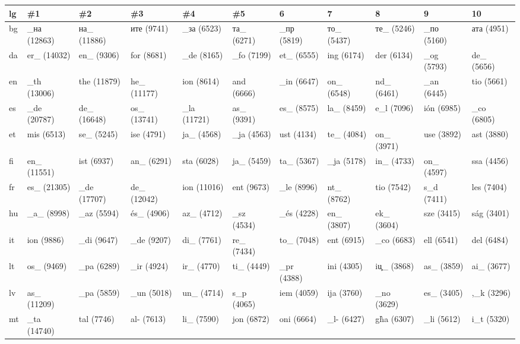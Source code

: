 \begin{tabular}{l|llllllllll}
lg&\#1&\#2&\#3&\#4&\#5&6&7&8&9&10\\
\hline
bg	&\foreignlanguage{russian}{\_на} (12863)	&\foreignlanguage{russian}{на\_} (11886)	&\foreignlanguage{russian}{ите} (9741)	&\foreignlanguage{russian}{\_за} (6523)	&\foreignlanguage{russian}{та\_} (6271)	&\foreignlanguage{russian}{\_пр} (5819)	&\foreignlanguage{russian}{то\_} (5437)	&\foreignlanguage{russian}{те\_} (5246)	&\foreignlanguage{russian}{\_по} (5160)	&\foreignlanguage{russian}{ата} (4951)\\
da	&er\_ (14032)	&en\_ (9306)	&for (8681)	&\_de (8165)	&\_fo (7199)	&et\_ (6555)	&ing (6174)	&der (6134)	&\_og (5793)	&de\_ (5656)\\
en	&\_th (13006)	&the (11879)	&he\_ (11177)	&ion (8614)	&and (6666)	&\_in (6647)	&on\_ (6548)	&nd\_ (6461)	&\_an (6445)	&tio (5661)\\
es	&\_de (20787)	&de\_ (16648)	&os\_ (13741)	&\_la (11721)	&as\_ (9391)	&es\_ (8575)	&la\_ (8459)	&e\_l (7096)	&ión (6985)	&\_co (6805)\\
et	&mis (6513)	&se\_ (5245)	&ise (4791)	&ja\_ (4568)	&\_ja (4563)	&ust (4134)	&te\_ (4084)	&on\_ (3971)	&use (3892)	&ast (3880)\\
fi	&en\_ (11551)	&ist (6937)	&an\_ (6291)	&sta (6028)	&ja\_ (5459)	&ta\_ (5367)	&\_ja (5178)	&in\_ (4733)	&on\_ (4597)	&ssa (4456)\\
fr	&es\_ (21305)	&\_de (17707)	&de\_ (12042)	&ion (11016)	&ent (9673)	&\_le (8996)	&nt\_ (8762)	&tio (7542)	&s\_d (7411)	&les (7404)\\
hu	&\_a\_ (8998)	&\_az (5594)	&és\_ (4906)	&az\_ (4712)	&\_sz (4534)	&\_és (4228)	&en\_ (3807)	&ek\_ (3604)	&sze (3415)	&ság (3401)\\
it	&ion (9886)	&\_di (9647)	&\_de (9207)	&di\_ (7761)	&re\_ (7434)	&to\_ (7048)	&ent (6915)	&\_co (6683)	&ell (6541)	&del (6484)\\
lt	&os\_ (9469)	&\_pa (6289)	&\_ir (4924)	&ir\_ (4770)	&ti\_ (4449)	&\_pr (4388)	&ini (4305)	&i\c u\_ (3868)	&as\_ (3859)	&ai\_ (3677)\\
lv	&as\_ (11209)	&\_pa (5859)	&\_un (5018)	&un\_ (4714)	&s\_p (4065)	&iem (4059)	&ija (3760)	&\_no (3629)	&es\_ (3405)	&,\_k (3296)\\
mt	&\_ta (14740)	&tal (7746)	&al- (7613)	&li\_ (7590)	&jon (6872)	&oni (6664)	&\_l- (6427)	&g\`ha (6307)	&\_li (5612)	&i\_t (5320)\\

\end{tabular}
